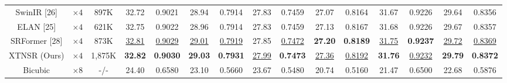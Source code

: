 \documentclass[twocolumn]{svjour3}          %
\begin{document}
\begin{table}
\begin{tabular}{|c|c|c|cc|cc|cc|cc|cc|cc|}

SwinIR [26] & $\times4$  &897K& \multicolumn{1}{c|}{32.72} &{0.9021} & \multicolumn{1}{c|}{28.94} &{0.7914}& \multicolumn{1}{c|}{27.83} &{0.7459} & \multicolumn{1}{c|}{27.07} &{0.8164}& \multicolumn{1}{c|}{31.67} &{0.9226} &\multicolumn{1}{c|}{29.64} &{0.8356}  \\


ELAN [25] & $\times 4$ &621K& \multicolumn{1}{c|}{32.75} & 0.9022 & \multicolumn{1}{c|}{28.96} & 0.7914 & \multicolumn{1}{c|}{27.83} & 0.7459 & \multicolumn{1}{c|}{27.13} &0.8167 & \multicolumn{1}{c|}{31.68} & 0.9226 &\multicolumn{1}{c|}{29.67} & 0.8357\\

SRFormer [28] & $\times 4$ &873K& \multicolumn{1}{c|}{\color{blue}\underline{32.81}} & {\color{blue}\underline{0.9029}} & \multicolumn{1}{c|}{\color{blue}\underline{29.01}} &{\color{blue}\underline{ 0.7919}} & \multicolumn{1}{c|}{27.85} & {\color{blue}\underline{0.7472}} & \multicolumn{1}{c|}{\color{red}\textbf{27.20}} & {\color{red}\textbf{0.8189}} & \multicolumn{1}{c|}{\color{blue}\underline{31.75}} &{\color{red}\textbf{0.9237}} &\multicolumn{1}{c|}{\color{blue}\underline{29.72}} & {\color{blue}\underline{ 0.8369}}\\

XTNSR (Ours) & $\times 4$ &1,875K& \multicolumn{1}{c|}{\color{red}\textbf{32.82}} &{\color{red}\textbf{0.9030}} & \multicolumn{1}{c|}{\color{red}\textbf{29.03} } &{\color{red}\textbf{ 0.7931}} & \multicolumn{1}{c|}{\color{blue}\underline{27.99}} &{\color{red}\textbf{0.7473}}& \multicolumn{1}{c|}{\color{blue}\underline{27.36}} &{\color{blue}\underline{0.8192}}& \multicolumn{1}{c|}{\color{red}\textbf{31.76}} &{\color{blue}\underline{0.9232}} &\multicolumn{1}{c|}{\color{red}\textbf{29.79}} & {\color{red}\textbf{0.8372}}\\

\hline

Bicubic&$\times8$ &-/-& \multicolumn{1}{c|}{24.40} &0.6580& \multicolumn{1}{c|}{23.10} &0.5660 & \multicolumn{1}{c|}{23.67} &0.5480& \multicolumn{1}{c|}{20.74} &0.5160 & \multicolumn{1}{c|}{21.47} & 0.6500
&\multicolumn{1}{c|}{22.68} & 0.5876     \\


\end{tabular}
\end{table}
\end{document}
